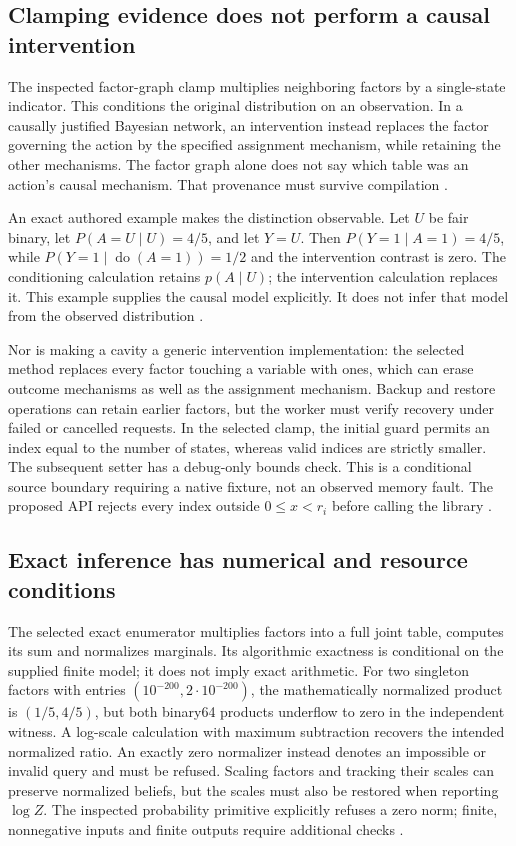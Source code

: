 \subsection{Clamping evidence does not perform a causal intervention}
The inspected factor-graph clamp multiplies neighboring factors by a
single-state indicator. This conditions the original distribution on an
observation. In a causally justified Bayesian network, an intervention
instead replaces the factor governing the action by the specified assignment
mechanism, while retaining the other mechanisms. The factor graph alone
does not say which table was an action's causal mechanism. That provenance
must survive compilation \cite{exec24_libdai_source,exec24_libdai_choice}.

An exact authored example makes the distinction observable. Let $U$ be fair
binary, let $P(A=U\mid U)=4/5$, and let $Y=U$. Then
$P(Y=1\mid A=1)=4/5$, while
$P(Y=1\mid\operatorname{do}(A=1))=1/2$ and the intervention contrast is zero.
The conditioning calculation retains $p(A\mid U)$; the intervention
calculation replaces it. This example supplies the causal model explicitly.
It does not infer that model from the observed distribution
\cite{exec24_libdai_choice}.

Nor is making a cavity a generic intervention implementation: the selected
method replaces every factor touching a variable with ones, which can erase
outcome mechanisms as well as the assignment mechanism. Backup and restore
operations can retain earlier factors, but the worker must verify recovery
under failed or cancelled requests. In the selected clamp, the initial
guard permits an index equal to the number of states, whereas valid indices
are strictly smaller. The subsequent setter has a debug-only bounds check.
This is a conditional source boundary requiring a native fixture, not an
observed memory fault. The proposed API rejects every index outside
$0\leq x<r_i$ before calling the library
\cite{exec24_libdai_source,exec24_libdai_choice}.

\subsection{Exact inference has numerical and resource conditions}
The selected exact enumerator multiplies factors into a full joint table,
computes its sum and normalizes marginals. Its algorithmic exactness is
conditional on the supplied finite model; it does not imply exact arithmetic.
For two singleton factors with entries $(10^{-200},2\cdot10^{-200})$, the
mathematically normalized product is $(1/5,4/5)$, but both binary64 products
underflow to zero in the independent witness. A log-scale calculation with
maximum subtraction recovers the intended normalized ratio. An exactly zero
normalizer instead denotes an impossible or invalid query and must be
refused. Scaling factors and tracking their scales can preserve normalized
beliefs, but the scales must also be restored when reporting $\log Z$.
The inspected probability primitive explicitly refuses a zero norm;
finite, nonnegative inputs and finite outputs require additional checks
\cite{exec24_libdai_source,exec24_libdai_choice}.

